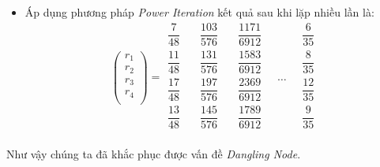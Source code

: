 \begin{itemize}
    \item Áp dụng phương pháp \emph{Power Iteration} kết quả sau khi lặp nhiều lần là: 
     $$ 
                \begin{pmatrix}
                    r_1 \\[15pt]
                    r_2 \\[15pt]
                    r_3 \\[15pt]
                    r_4 \\[15pt]
                \end{pmatrix}
                =
                \begin{matrix}
                    \dfrac{7}{48} \\[10pt]
                    \dfrac{11}{48} \\[10pt]
                    \dfrac{17}{48}\\[10pt]
                    \dfrac{13}{48} \\[10pt]
                \end{matrix}
                \quad
                \begin{matrix}
                    \dfrac{103}{576} \\[10pt]
                    \dfrac{131}{576} \\[10pt]
                    \dfrac{197}{576}\\[10pt]
                    \dfrac{145}{576} \\[10pt]
                \end{matrix}
                \quad
                \begin{matrix}
                    \dfrac{1171}{6912} \\[10pt]
                    \dfrac{1583}{6912} \\[10pt]
                    \dfrac{2369}{6912}\\[10pt]
                    \dfrac{1789}{6912} \\[10pt]
                \end{matrix}
                \quad
                \ldots
                \quad
                \begin{matrix}
                    \dfrac{6}{35}\\[10pt]
                    \dfrac{8}{35}\\[10pt]
                    \dfrac{12}{35}\\[10pt]
                    \dfrac{9}{35}\\
                \end{matrix}
                $$ 
\end{itemize}
Như vậy chúng ta đã khắc phục được vấn đề \emph{Dangling Node}.
